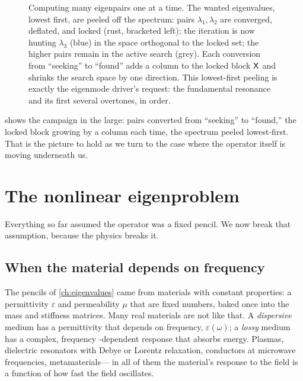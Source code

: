 \begin{figure}[t]
\caption[Peeling the spectrum lowest-first]{Computing many eigenpairs one at a
time. The wanted eigenvalues, lowest first, are peeled off the spectrum: pairs
$\lambda_1,\lambda_2$ are converged, deflated, and locked (rust, bracketed left);
the iteration is now hunting $\lambda_3$ (blue) in the space orthogonal to the
locked set; the higher pairs remain in the active search (grey). Each conversion
from ``seeking'' to ``found'' adds a column to the locked block $\mathsf{X}$ and
shrinks the search space by one direction. This lowest-first peeling is exactly
the eigenmode driver's request: the fundamental resonance and its first several
overtones, in order.}
\label{fig:peel-spectrum}
\end{figure}

 shows the campaign in the large: pairs converted from
``seeking'' to ``found,'' the locked block growing by a column each time, the
spectrum peeled lowest-first. That is the picture to hold as we turn to the case
where the operator itself is moving underneath us.

\section{The nonlinear eigenproblem}
\label{sec:def-nep}

Everything so far assumed the operator was a fixed pencil. We now break that
assumption, because the physics breaks it.

\subsection{When the material depends on frequency}
\label{sec:def-dispersive}

The pencils of \cref{ch:eigenvalues} came from materials with constant
properties: a permittivity $\varepsilon$ and permeability $\mu$ that are fixed
numbers, baked once into the mass and stiffness matrices. Many real materials are
not like that. A \emph{dispersive} medium has a permittivity that depends on
frequency, $\varepsilon(\omega)$; a \emph{lossy} medium has a complex, frequency
-dependent response that absorbs energy. Plasmas, dielectric resonators with
Debye or Lorentz relaxation, conductors at microwave frequencies, metamaterials---
in all of them the material's response to the field is a function of how fast the
field oscillates.

